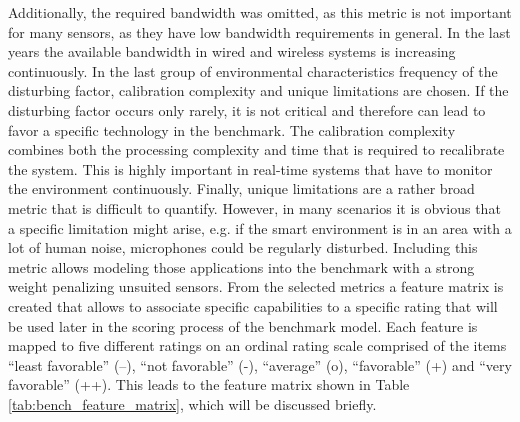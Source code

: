 Additionally, the required bandwidth was omitted, as this metric is not important for many sensors, as they have low bandwidth requirements in general. In the last years the available bandwidth in wired and wireless systems is increasing continuously. In the last group of environmental characteristics frequency of the disturbing factor, calibration complexity and unique limitations are chosen. If the disturbing factor occurs only rarely, it is not critical and therefore can lead to favor a specific technology in the benchmark. The calibration complexity combines both the processing complexity and time that is required to recalibrate the system. This is highly important in real-time systems that have to monitor the environment continuously. Finally, unique limitations are a rather broad metric that is difficult to quantify. However, in many scenarios it is obvious that a specific limitation might arise, e.g. if the smart environment is in an area with a lot of human noise, microphones could be regularly disturbed. Including this metric allows modeling those applications into the benchmark with a strong weight penalizing unsuited sensors. From the selected metrics a feature matrix is created that allows  to associate specific capabilities to a specific rating that will be used later in the scoring process of the benchmark model. Each feature is mapped to five different ratings on an ordinal rating scale comprised of the items “least favorable” (--), “not favorable” (-), “average” (o), “favorable” (+) and “very favorable” (++). This leads to the feature matrix shown in Table \ref{tab:bench_feature_matrix}, which will be discussed briefly.
